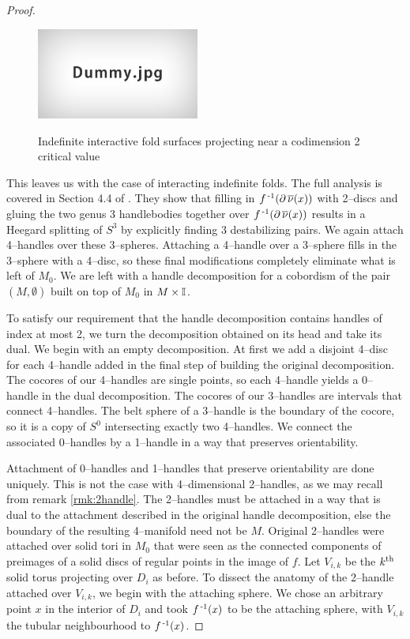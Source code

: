 \begin{proof}
	\begin{figure}
		\centering
		\caption{Indefinite interactive fold surfaces projecting near a codimension 2 critical value}
		\includegraphics[height=3cm]{figures/dummy.jpg}
		\label{fig:interactivefoldprojcodim2}		
	\end{figure}
	
	This leaves us with the case of interacting indefinite folds.
	The full analysis is covered in Section 4.4 of \cite{CostThur08}.
	They show that filling in $f^{\,\text{-}1}(\partial\,\overline{\nu}(x))$ with 2--discs and gluing the two genus 3 handlebodies together over $f^{\,\text{-}1}(\partial\,\overline{\nu}(x))$ results in a Heegard splitting of $S^3$ by explicitly finding 3 destabilizing pairs.
	We again attach 4--handles over these 3--spheres.
	Attaching a 4--handle over a 3--sphere fills in the 3--sphere with a 4--disc, so these final modifications completely eliminate what is left of $M_0$.
	We are left with a handle decomposition for a cobordism of the pair $(M,\emptyset)$ built on top of $M_0$ in $M\times\mathbb{I}$.

	To satisfy our requirement that the handle decomposition contains handles of index at most 2, we turn the decomposition obtained on its head and take its dual.
	We begin with an empty decomposition.
	At first we add a disjoint 4--disc for each 4--handle added in the final step of building the original decomposition.
	The cocores of our 4--handles are single points, so each 4--handle yields a 0--handle in the dual decomposition.
	The cocores of our 3--handles are intervals that connect 4--handles.
	The belt sphere of a 3--handle is the boundary of the cocore, so it is a copy of $S^0$ intersecting exactly two 4--handles.
	We connect the associated 0--handles by a 1--handle in a way that preserves orientability.

	Attachment of 0--handles and 1--handles that preserve orientability are done uniquely.
	This is not the case with 4--dimensional 2--handles, as we may recall from remark \ref{rmk:2handle}.
	The 2--handles must be attached in a way that is dual to the attachment described in the original handle decomposition, else the boundary of the resulting 4--manifold need not be $M$.
	Original 2--handles were attached over solid tori in $M_0$ that were seen as the connected components of preimages of a solid discs of regular points in the image of $f$.
	Let $V_{i,k}$ be the $k^{\text{th}}$ solid torus projecting over $D_i$ as before.
	To dissect the anatomy of the 2--handle attached over $V_{i,k}$, we begin with the attaching sphere.
	We chose an arbitrary point $x$ in the interior of $D_i$ and took $f^{\,\text{-}1}(x)$ to be the attaching sphere, with $V_{i,k}$ the tubular neighbourhood to $f^{\,\text{-}1}(x)$.
	


		
\end{proof}

